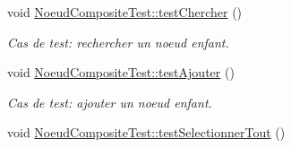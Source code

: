 \begin{DoxyCompactItemize}
void \hyperlink{group__inf2990_ga684b84f99cf5a559386a96b8c4468683}{Noeud\-Composite\-Test\-::test\-Chercher} ()
\begin{DoxyCompactList}\small\item\em Cas de test\-: rechercher un noeud enfant. \end{DoxyCompactList}\item 
void \hyperlink{group__inf2990_gaaeb7bf3f97cb196df2398cdf1a639469}{Noeud\-Composite\-Test\-::test\-Ajouter} ()
\begin{DoxyCompactList}\small\item\em Cas de test\-: ajouter un noeud enfant. \end{DoxyCompactList}\item 
\hypertarget{group__inf2990_ga585be1924a9bfe61c2ee7bf91491695a}{void \hyperlink{group__inf2990_ga585be1924a9bfe61c2ee7bf91491695a}{Noeud\-Composite\-Test\-::test\-Selectionner\-Tout} ()}\label{group__inf2990_ga585be1924a9bfe61c2ee7bf91491695a}


\end{DoxyCompactItemize}
